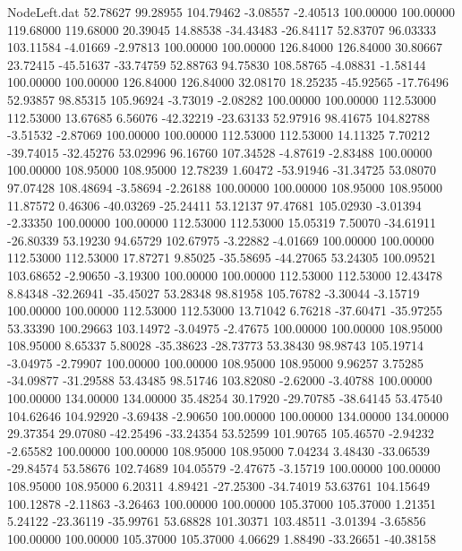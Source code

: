 \begin{filecontents}{NodeLeft.dat}
  52.78627   99.28955  104.79462    -3.08557   -2.40513  100.00000  100.00000  119.68000  119.68000   20.39045   14.88538  -34.43483  -26.84117
  52.83707   96.03333  103.11584    -4.01669   -2.97813  100.00000  100.00000  126.84000  126.84000   30.80667   23.72415  -45.51637  -33.74759
  52.88763   94.75830  108.58765    -4.08831   -1.58144  100.00000  100.00000  126.84000  126.84000   32.08170   18.25235  -45.92565  -17.76496
  52.93857   98.85315  105.96924    -3.73019   -2.08282  100.00000  100.00000  112.53000  112.53000   13.67685    6.56076  -42.32219  -23.63133
  52.97916   98.41675  104.82788    -3.51532   -2.87069  100.00000  100.00000  112.53000  112.53000   14.11325    7.70212  -39.74015  -32.45276
  53.02996   96.16760  107.34528    -4.87619   -2.83488  100.00000  100.00000  108.95000  108.95000   12.78239    1.60472  -53.91946  -31.34725
  53.08070   97.07428  108.48694    -3.58694   -2.26188  100.00000  100.00000  108.95000  108.95000   11.87572    0.46306  -40.03269  -25.24411
  53.12137   97.47681  105.02930    -3.01394   -2.33350  100.00000  100.00000  112.53000  112.53000   15.05319    7.50070  -34.61911  -26.80339
  53.19230   94.65729  102.67975    -3.22882   -4.01669  100.00000  100.00000  112.53000  112.53000   17.87271    9.85025  -35.58695  -44.27065
  53.24305  100.09521  103.68652    -2.90650   -3.19300  100.00000  100.00000  112.53000  112.53000   12.43478    8.84348  -32.26941  -35.45027
  53.28348   98.81958  105.76782    -3.30044   -3.15719  100.00000  100.00000  112.53000  112.53000   13.71042    6.76218  -37.60471  -35.97255
  53.33390  100.29663  103.14972    -3.04975   -2.47675  100.00000  100.00000  108.95000  108.95000    8.65337    5.80028  -35.38623  -28.73773
  53.38430   98.98743  105.19714    -3.04975   -2.79907  100.00000  100.00000  108.95000  108.95000    9.96257    3.75285  -34.09877  -31.29588
  53.43485   98.51746  103.82080    -2.62000   -3.40788  100.00000  100.00000  134.00000  134.00000   35.48254   30.17920  -29.70785  -38.64145
  53.47540  104.62646  104.92920    -3.69438   -2.90650  100.00000  100.00000  134.00000  134.00000   29.37354   29.07080  -42.25496  -33.24354
  53.52599  101.90765  105.46570    -2.94232   -2.65582  100.00000  100.00000  108.95000  108.95000    7.04234    3.48430  -33.06539  -29.84574
  53.58676  102.74689  104.05579    -2.47675   -3.15719  100.00000  100.00000  108.95000  108.95000    6.20311    4.89421  -27.25300  -34.74019
  53.63761  104.15649  100.12878    -2.11863   -3.26463  100.00000  100.00000  105.37000  105.37000    1.21351    5.24122  -23.36119  -35.99761
  53.68828  101.30371  103.48511    -3.01394   -3.65856  100.00000  100.00000  105.37000  105.37000    4.06629    1.88490  -33.26651  -40.38158

\end{filecontents}
